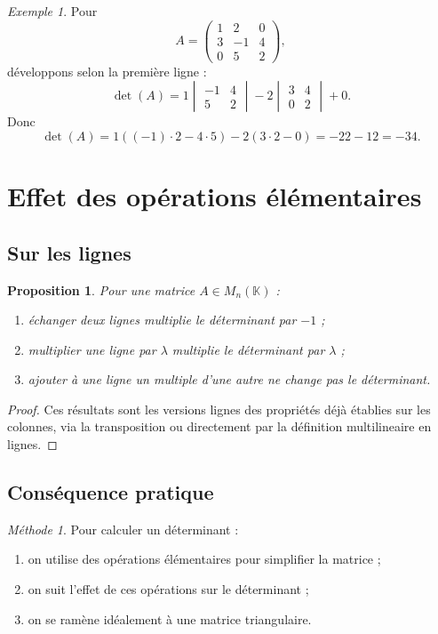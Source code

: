 \documentclass[11pt,a4paper]{article}
\newtheorem{proposition}[definition]{Proposition}
\theoremstyle{remark}
\newtheorem{exemple}[definition]{Exemple}
\newtheorem*{methode}{Méthode}
\newcommand{\K}{\mathbb{K}}
\begin{document}
\begin{exemple}
Pour
\[
A=
\begin{pmatrix}
1 & 2 & 0\\
3 & -1 & 4\\
0 & 5 & 2
\end{pmatrix},
\]
développons selon la première ligne :
\[
\det(A)=1
\begin{vmatrix}
-1 & 4\\
5 & 2
\end{vmatrix}
-2
\begin{vmatrix}
3 & 4\\
0 & 2
\end{vmatrix}
+0.
\]
Donc
\[
\det(A)=1((-1)\cdot 2-4\cdot 5)-2(3\cdot 2-0)
=-22-12=-34.
\]
\end{exemple}

\section{Effet des opérations élémentaires}

\subsection{Sur les lignes}

\begin{proposition}
Pour une matrice \(A\in M_n(\K)\) :
\begin{enumerate}[label=\arabic*)]
    \item échanger deux lignes multiplie le déterminant par \(-1\) ;
    \item multiplier une ligne par \(\lambda\) multiplie le déterminant par \(\lambda\) ;
    \item ajouter à une ligne un multiple d’une autre ne change pas le déterminant.
\end{enumerate}
\end{proposition}

\begin{proof}
Ces résultats sont les versions lignes des propriétés déjà établies sur les colonnes, via la transposition ou directement par la définition multilineaire en lignes.
\end{proof}

\subsection{Conséquence pratique}

\begin{methode}
Pour calculer un déterminant :
\begin{enumerate}
    \item on utilise des opérations élémentaires pour simplifier la matrice ;
    \item on suit l’effet de ces opérations sur le déterminant ;
    \item on se ramène idéalement à une matrice triangulaire.
\end{enumerate}
\end{methode}
\end{document}
